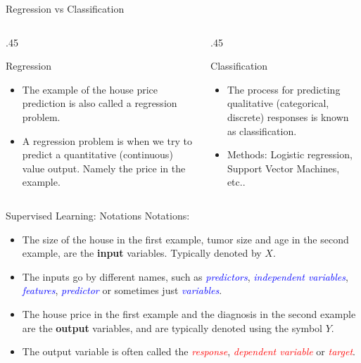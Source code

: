 \documentclass[
  9pt,
  ignorenonframetext,
  aspectratio=169,
  t, dvipsnames]{beamer}
\theoremstyle{definition}
\def\begincols{\begin{columns}}
\def\begincol{\begin{column}}
\def\endcol{\end{column}}
\def\endcols{\end{columns}}
\begin{document}
\begin{frame}{Regression vs Classification}
\protect\hypertarget{regression-vs-classification}{}
\begincols
\begincol{.45\textwidth}
\begin{block}{Regression}
\begin{itemize}
\item The example of the house price prediction is also called a
  \alert{regression} problem.
\item A regression problem is when we try to predict a \alert{quantitative
  (continuous)} value output. Namely the price in the example.
\end{itemize}
\end{block}

\endcol

\begincol{.45\textwidth}
\begin{block}{Classification}
\begin{itemize}
\item The process for predicting \alert{qualitative (categorical,
  discrete)} responses is known as classification.
\item Methods: Logistic regression, Support Vector Machines, etc..
\end{itemize}
\end{block}

\endcol
\endcols
\end{frame}

\begin{frame}{Supervised Learning: Notations}
\protect\hypertarget{supervised-learning-notations}{}
Notations:

\begin{itemize}
\item The size of the house in the first example, tumor size and age in the second example, are the \textbf{\textcolor{barcolor}{input}} variables. Typically
  denoted by \(X\).
\item The inputs go by different names, such as
  \emph{\textcolor{blue}{predictors}},
  \emph{\textcolor{blue}{independent variables}},
  \emph{\textcolor{blue}{features}}, \emph{\textcolor{blue}{predictor}}
  or sometimes just \emph{\textcolor{blue}{variables}}.  \pause
\item The house price in the first example and the diagnosis in the second example are the \textbf{\textcolor{barcolor}{output}} variables, and are typically
  denoted using the symbol \(Y\).
\item The output variable is often called the
  \emph{\textcolor{red}{response}},
  \emph{\textcolor{red}{dependent variable}} or
  \emph{\textcolor{red}{target}}.
\end{itemize}
\end{frame}
\end{document}
